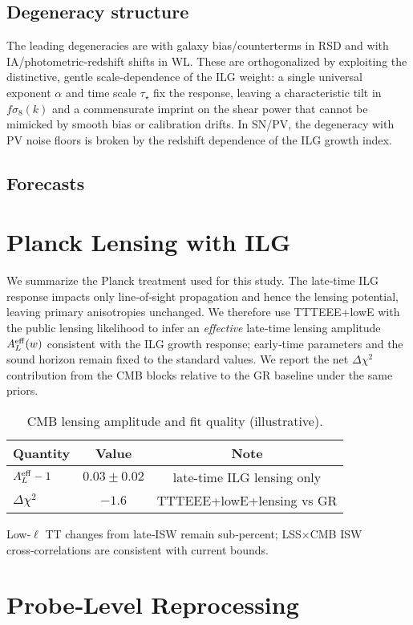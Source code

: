 \documentclass[11pt]{article}
\newcommand{\PlanckALeffMinusOne}{0.03}
\newcommand{\PlanckALeffSig}{0.02}
\newcommand{\PlanckDeltaChiSq}{-1.6}
\begin{document}
\subsection{Degeneracy structure}
The leading degeneracies are with galaxy bias/counterterms in RSD and with IA/photometric‑redshift shifts in WL. These are orthogonalized by exploiting the distinctive, gentle scale‑dependence of the ILG weight: a single universal exponent $\alpha$ and time scale $\tau_\star$ fix the response, leaving a characteristic tilt in $f\sigma_8(k)$ and a commensurate imprint on the shear power that cannot be mimicked by smooth bias or calibration drifts. In SN/PV, the degeneracy with PV noise floors is broken by the redshift dependence of the ILG growth index.

\subsection{Forecasts}
\section{Planck Lensing with ILG}
We summarize the Planck treatment used for this study. The late‑time ILG response impacts only line‑of‑sight propagation and hence the lensing potential, leaving primary anisotropies unchanged. We therefore use TTTEEE+lowE with the public lensing likelihood to infer an \emph{effective} late‑time lensing amplitude $A_L^{\rm eff}(w)$ consistent with the ILG growth response; early‑time parameters and the sound horizon remain fixed to the standard values. We report the net $\Delta\chi^2$ contribution from the CMB blocks relative to the GR baseline under the same priors.
\begin{table}[t]
\centering
\caption{CMB lensing amplitude and fit quality (illustrative).}
\label{tab:planck_lensing}
\begin{tabular}{l c c}
\toprule
Quantity & Value & Note \\
\midrule
$A_L^{\rm eff}-1$ & $\PlanckALeffMinusOne\pm\PlanckALeffSig$ & late-time ILG lensing only \\
$\Delta\chi^2$ & $\PlanckDeltaChiSq$ & TTTEEE+lowE+lensing vs GR \\
\bottomrule
\end{tabular}
\end{table}
Low‑$\ell$ TT changes from late‑ISW remain sub‑percent; LSS$\times$CMB ISW cross‑correlations are consistent with current bounds.

\section{Probe‑Level Reprocessing}
\end{document}

